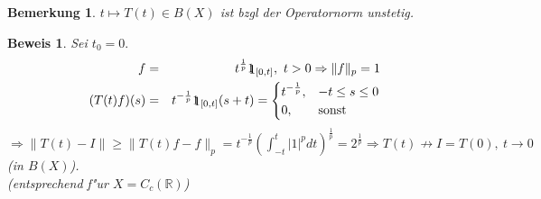 \documentclass[a4paper,11pt]{book}
\newcommand{\R}{{\mathbb R}}
\newcommand{\ind}{1\hspace{-0,9ex}\raisebox{-0,2ex}{1}}
\newtheorem*{BemNO}{Bemerkung}
\theoremstyle{nonumberplain}
\newtheorem{Bew}{Beweis}
\begin{document}
\begin{BemNO}
$t \mapsto T(t) \in B(X)$ ist bzgl der Operatornorm unstetig.
\end{BemNO}


\begin{Bew}
Sei $t_0 = 0.$
\begin{eqnarray*}
f & = & t^{\frac1{p}} \ind_{[0,t]},\ t > 0 \Rightarrow \|f\|_p = 1 \\
(T(t)f)(s) & = & t^{-\frac1{p}} \ind_{[0,t]}(s+t) = \begin{cases}
t^{-\frac1{p}}, & -t \leq s \leq 0 \\
0,& \text{sonst}
\end{cases}
\end{eqnarray*}
$\Rightarrow \|T(t)-I\| \geq \|T(t)f - f\|_p = t^{-\frac1{p}} (\int_{-t}^t |1|^p dt)^{\frac1{p}} = 2^{\frac1{p}} \Rightarrow T(t) \not\rightarrow I = T(0),\ t \rightarrow 0$ (in $B(X)$).\\
(entsprechend f"ur $X = C_c(\R)$)
\end{Bew}
\end{document}
